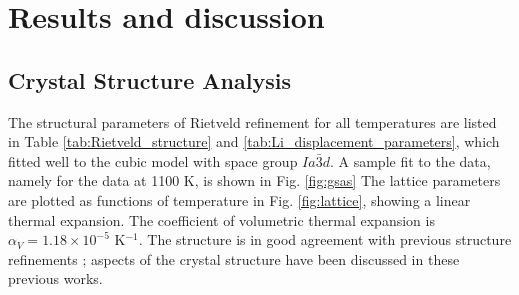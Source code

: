 \documentclass[twoside,twocolumn,9pt]{article}
\begin{document}
%


\section{Results and discussion}

\subsection{Crystal Structure Analysis}

The structural parameters of Rietveld refinement for all temperatures are listed in Table \ref{tab:Rietveld_structure} and \ref{tab:Li_displacement_parameters},
which fitted well to the cubic model with space group $Ia\bar{3}d$. A sample fit to the data, namely for the data at 1100 K, is shown in Fig. \ref{fig:gsas}
The lattice parameters are plotted as functions of temperature in Fig. \ref{fig:lattice}, showing a linear thermal expansion. The coefficient of volumetric thermal expansion is $\alpha_V = 1.18 \times 10^{-5}$ K$^{-1}$. The structure is in good agreement with previous structure refinements \cite{Awaka:2009jv,Buschmann:2011jo,Geiger:2011cg, Awaka:2011il, DanielRettenwander:2016ei,Wagner:2016bh,Kataoka:2019go, Xie:2011gv,Han:2012is,Li:2012fz,Wang:2014ic}; aspects of the crystal structure have been discussed in these previous works.
\end{document}
